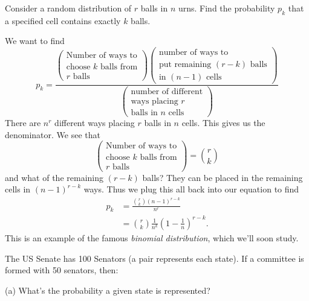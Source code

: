 Consider a random distribution of $r$ balls in $n$ urns. Find the
probability $p_{k}$ that a specified cell contains exactly $k$ balls.

We want to find
\begin{equation}
p_{k} = \frac{\begin{pmatrix}
    \mbox{Number of ways to}\\
    \mbox{choose $k$ balls from}\\
    \mbox{$r$ balls}
  \end{pmatrix}
\begin{pmatrix}
  \mbox{number of ways to}\\
  \mbox{put remaining $(r-k)$ balls}\\
  \mbox{in $(n-1)$ cells}
\end{pmatrix}}{\begin{pmatrix}\mbox{number of different}\\
\mbox{ways placing $r$}\\
\mbox{balls in $n$ cells}
  \end{pmatrix}}
\end{equation}
There are $n^{r}$ different ways placing $r$ balls in $n$ cells. This
gives us the denominator. We see that
\begin{equation}
\begin{pmatrix}
    \mbox{Number of ways to}\\
    \mbox{choose $k$ balls from}\\
    \mbox{$r$ balls}
  \end{pmatrix} = {r\choose k}
\end{equation}
and what of the remaining $(r-k)$ balls? They can be placed in the
remaining cells in $(n-1)^{r-k}$ ways. Thus we plug this all back into
our equation to find
\begin{equation}
\begin{split}
p_{k}&=\frac{{r\choose k}(n-1)^{r-k}}{n^{r}}\\
&={r\choose k}\frac{1}{n^{k}}\left(1-\frac{1}{n}\right)^{r-k}.
\end{split}
\end{equation}
This is an example of the famous \emph{binomial distribution}, which
we'll soon study.

The US Senate has 100 Senators (a pair represents each state). If a
committee is formed with 50 senators, then:

(a) What's the probability a given state is represented?

